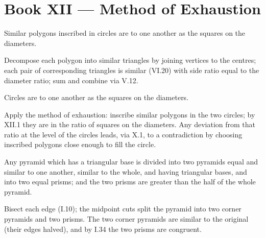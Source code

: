%
%

\section{Book XII --- Method of Exhaustion}
\label{sec:book-XII}

\begin{claim}
\label{prop:XII.1}
Similar polygons inscribed in circles are to one another as the
squares on the diameters.
\end{claim}
\begin{evidence}
\label{ev:XII.1}
Decompose each polygon into similar triangles by joining vertices to
the centres; each pair of corresponding triangles is similar (VI.20)
with side ratio equal to the diameter ratio; sum and combine via
V.12.
\end{evidence}

\begin{claim}
\label{prop:XII.2}
Circles are to one another as the squares on the diameters.
\end{claim}
\begin{evidence}
\label{ev:XII.2}
Apply the method of exhaustion: inscribe similar polygons in the two
circles; by XII.1 they are in the ratio of squares on the diameters.
Any deviation from that ratio at the level of the circles leads, via
X.1, to a contradiction by choosing inscribed polygons close enough
to fill the circle.
\end{evidence}

\begin{claim}
\label{prop:XII.3}
Any pyramid which has a triangular base is divided into two pyramids
equal and similar to one another, similar to the whole, and having
triangular bases, and into two equal prisms; and the two prisms are
greater than the half of the whole pyramid.
\end{claim}
\begin{evidence}
\label{ev:XII.3}
Bisect each edge (I.10); the midpoint cuts split the pyramid into
two corner pyramids and two prisms.  The two corner pyramids are
similar to the original (their edges halved), and by I.34 the two
prisms are congruent.
\end{evidence}

